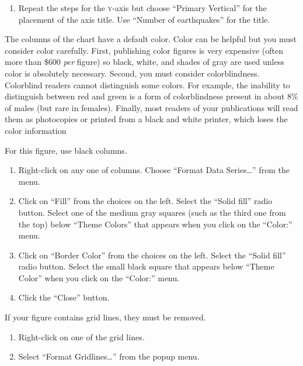 \documentclass[12pt, hidelinks]{exam}
\newcommand*\axis[1]{{\scshape #1}-axis}
\begin{document}
\begin{questions}
\begin{enumerate}[resume]
	\item Repeat the steps for the \axis{y} but choose “Primary Vertical” for the placement of the axis title. Use “Number of earthquakes” for the title. 
	
\end{enumerate}

The columns of the chart have a default color. Color can be helpful but you must consider color carefully. First, publishing color figures is very expensive (often more than \$600 \emph{per} figure) so black, white, and shades of gray are used unless color is absolutely necessary. Second, you must consider colorblindness. Colorblind readers cannot distinguish some colors. For example, the inability to distinguish between red and green is a form of colorblindness present in about 8\% of males (but rare in females). Finally, most readers
of your publications will read them as photocopies or printed from
a black and white printer, which loses the color information

For this figure, use black columns.

\begin{enumerate}[resume]
	\item Right-click on any one of columns. Choose “Format Data Series\dots” from the menu.
	
	\item Click on “Fill” from the choices on the left. Select the “Solid fill” radio button. Select one of the medium gray squares (such as the third one from the top) below “Theme Colors” that appears when you click on the “Color:” menu.
	
	\item Click on “Border Color” from the choices on the left. Select the “Solid fill” radio button. Select the small black square that appears below “Theme Color” when you click on the “Color:” menu.
	
	\item Click the “Close” button.
	
\end{enumerate}

If your figure contains grid lines, they must be removed.

\begin{enumerate}[resume]
	\item Right-click on one of the grid lines. 
	
	\item Select “Format Gridlines\dots” from the popup menu. 
	

\end{enumerate}
\end{questions}
\end{document}
